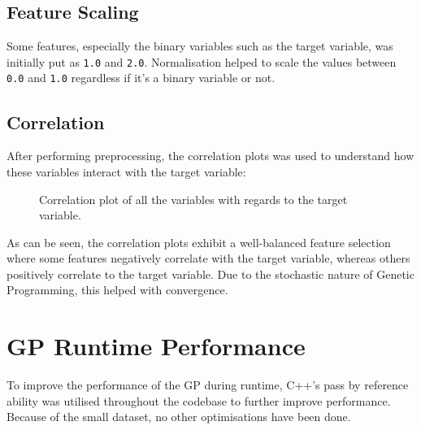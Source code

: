 \documentclass{article}
\begin{document}
\subsection{Feature Scaling}
Some features, especially the binary variables such as the target variable, was initially put as \texttt{1.0} and \texttt{2.0}. Normalisation helped to scale the values between \texttt{0.0} and \texttt{1.0} regardless if it's a binary variable or not.

\subsection{Correlation}
After performing preprocessing, the correlation plots was used to understand how these variables interact with the target variable:

\begin{figure}[H]
  \caption{Correlation plot of all the variables with regards to the target variable.}
\end{figure}

As can be seen, the correlation plots exhibit a well-balanced feature selection where some features negatively correlate with the target variable, whereas others positively correlate to the target variable. Due to the stochastic nature of Genetic Programming, this helped with convergence.

\section{GP Runtime Performance}
To improve the performance of the GP during runtime, C++'s pass by reference ability was utilised throughout the codebase to further improve performance. Because of the small dataset, no other optimisations have been done.
\end{document}
